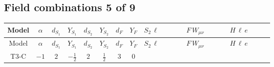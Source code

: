\documentclass[8pt]{article}
\begin{document}
\begin{landscape}
\subsection*{Field combinations 5 of 9}
\begin{longtable}{@{}cccccccc >{\raggedright\arraybackslash}p{0.21\linewidth} >{\raggedright\arraybackslash}p{0.21\linewidth} >{\raggedright\arraybackslash}p{0.21\linewidth}@{}}
\toprule
Model & $\alpha$ & $d_{S_1}$ & $Y_{S_1}$ & $d_{S_2}$ & $Y_{S_2}$ & $d_F$ & $Y_F$ & $S_2\,\ell$ & $F\,W_{\mu\nu}$ & $H\,\ell\,e$ \\
\midrule
\endfirsthead
\toprule
Model & $\alpha$ & $d_{S_1}$ & $Y_{S_1}$ & $d_{S_2}$ & $Y_{S_2}$ & $d_F$ & $Y_F$ & $S_2\,\ell$ & $F\,W_{\mu\nu}$ & $H\,\ell\,e$ \\
\midrule
\endhead
T3-C & $-1$ & $2$ & $-\frac{1}{2}$ & $2$ & $\frac{1}{2}$ & $3$ & $0$ & \scriptsize\adjustbox{max width=\linewidth}{$\begin{gathered} +\frac{3 \hbar  \overline{y_{2,i_1,r_1}} \overline{y_{2,i_2,r_1}} L_{a_2,i_2}{}^T\, C\, P_L\, L_{a_1,i_1} S_{2,j_1} S_{2,j_2} \text{Bar}(\text{cg1})_{a_1,j_1,a_2,j_2} g_2^2}{8 \epsilon  M_F} \\ +\frac{\hbar  \overline{y_{2,i_1,r_1}} \overline{y_{2,i_2,r_1}} L_{a_2,i_2}{}^T\, C\, P_L\, L_{a_1,i_1} S_{2,j_1} S_{2,j_2} \text{Bar}(\text{cg1})_{a_1,j_1,a_2,j_2} g_2^2}{8 M_F} \\ +\frac{3 \hbar  \overline{L_{a_1,i_1}}\, C\, P_R\, \overline{L_{a_2,i_2}}{}^T \text{cg1}_{a_1,j_1,a_2,j_2} y_{2,i_1,r_1} y_{2,i_2,r_1} S_{2,j_1}{}^{\dagger } S_{2,j_2}{}^{\dagger } g_2^2}{8 \epsilon  M_F}\end{gathered}$} & \scriptsize\adjustbox{max width=\linewidth}{$\begin{gathered} -\hbar  \log \left(\frac{\bar{\mu}^{2}}{M_F^2}\right) \left(W_{\mu _1\mu _2}^{A_1}\right){}^2\end{gathered}$} & \scriptsize\adjustbox{max width=\linewidth}{$\begin{gathered} +\frac{\sqrt{3} \hbar  \overline{y_{1,i_3,r_1}} \overline{L_{a_1,i_2}}\, P_R\, e_{i_1} H_{a_1} y_{1,i_2,r_1} Y_{e,i_3,i_1}}{4 \epsilon } \\ +\frac{3}{8} \sqrt{3} \hbar  \overline{y_{1,i_3,r_1}} \overline{L_{a_1,i_2}}\, P_R\, e_{i_1} H_{a_1} y_{1,i_2,r_1} Y_{e,i_3,i_1} \\ +\frac{\sqrt{3} \hbar  \overline{y_{2,i_3,r_1}} \overline{L_{a_1,i_2}}\, P_R\, e_{i_1} H_{a_1} y_{2,i_2,r_1} Y_{e,i_3,i_1}}{4 \epsilon }\end{gathered}$} \\

\end{longtable}
\end{landscape}
\end{document}
